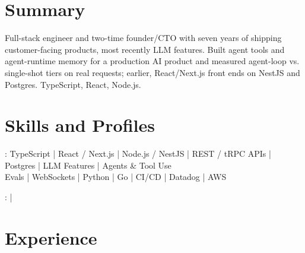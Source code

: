 \documentclass[print]{jack-resume}
\begin{document}
\pagecolor{darkmodeBackground}


\begin{minipage}[t][1cm][t]{.03\textwidth}
    \hfill
\end{minipage}

\section{Summary}
Full-stack engineer and two-time founder/CTO with seven years of shipping customer-facing products, most recently LLM features. Built agent tools and agent-runtime memory for a production AI product and measured agent-loop vs. single-shot tiers on real requests; earlier, React/Next.js front ends on NestJS and Postgres. TypeScript, React, Node.js.
\sectionsep

\section{Skills and Profiles}
:
TypeScript \hfill | \hfill
React / Next.js \hfill | \hfill
Node.js / NestJS \hfill | \hfill
REST / tRPC APIs \hfill | \hfill
Postgres \hfill | \hfill
LLM Features \hfill | \hfill
Agents \& Tool Use \\
\hspace{1.0cm} Evals \hfill | \hfill
WebSockets \hfill | \hfill
Python \hfill | \hfill
Go \hfill | \hfill
CI/CD \hfill | \hfill
Datadog \hfill | \hfill
AWS \\

\raggedright{
    :
      \href{https://www.linkedin.com/in/jack-sturtevant/}{ \ExternalLink} |
     \href{https://github.com/jacksturt}{ \ExternalLink}}

\section{Experience}
\end{document}
